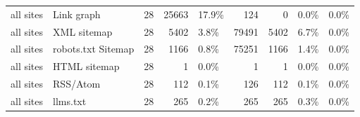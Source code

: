 \begin{table}[t]
{\begin{tabular}{llrrlrrll}
all sites & Link graph & 28 & 25663 & 17.9\% & 124 & 0 & 0.0\% & 0.0\% \\
all sites & XML sitemap & 28 & 5402 & 3.8\% & 79491 & 5402 & 6.7\% & 0.0\% \\
all sites & robots.txt Sitemap & 28 & 1166 & 0.8\% & 75251 & 1166 & 1.4\% & 0.0\% \\
all sites & HTML sitemap & 28 & 1 & 0.0\% & 1 & 1 & 0.0\% & 0.0\% \\
all sites & RSS/Atom & 28 & 112 & 0.1\% & 126 & 112 & 0.1\% & 0.0\% \\
all sites & llms.txt & 28 & 265 & 0.2\% & 265 & 265 & 0.3\% & 0.0\% \\
\bottomrule
\end{tabular}}
\end{table}
